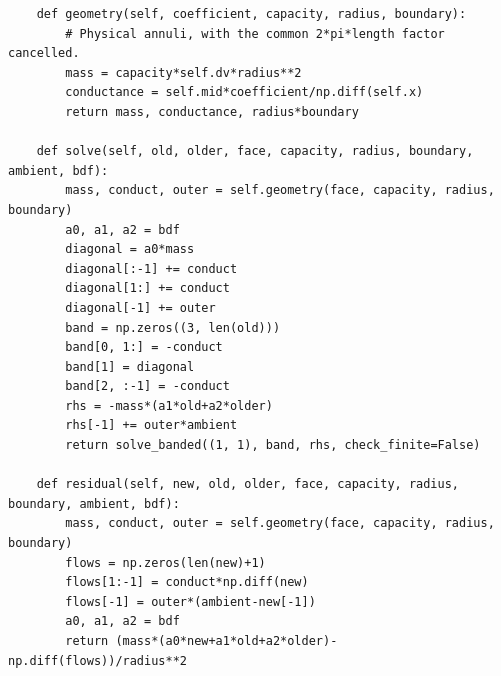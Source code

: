 \begin{verbatim}
    def geometry(self, coefficient, capacity, radius, boundary):
        # Physical annuli, with the common 2*pi*length factor cancelled.
        mass = capacity*self.dv*radius**2
        conductance = self.mid*coefficient/np.diff(self.x)
        return mass, conductance, radius*boundary

    def solve(self, old, older, face, capacity, radius, boundary, ambient, bdf):
        mass, conduct, outer = self.geometry(face, capacity, radius, boundary)
        a0, a1, a2 = bdf
        diagonal = a0*mass
        diagonal[:-1] += conduct
        diagonal[1:] += conduct
        diagonal[-1] += outer
        band = np.zeros((3, len(old)))
        band[0, 1:] = -conduct
        band[1] = diagonal
        band[2, :-1] = -conduct
        rhs = -mass*(a1*old+a2*older)
        rhs[-1] += outer*ambient
        return solve_banded((1, 1), band, rhs, check_finite=False)

    def residual(self, new, old, older, face, capacity, radius, boundary, ambient, bdf):
        mass, conduct, outer = self.geometry(face, capacity, radius, boundary)
        flows = np.zeros(len(new)+1)
        flows[1:-1] = conduct*np.diff(new)
        flows[-1] = outer*(ambient-new[-1])
        a0, a1, a2 = bdf
        return (mass*(a0*new+a1*old+a2*older)-np.diff(flows))/radius**2


\end{verbatim}
